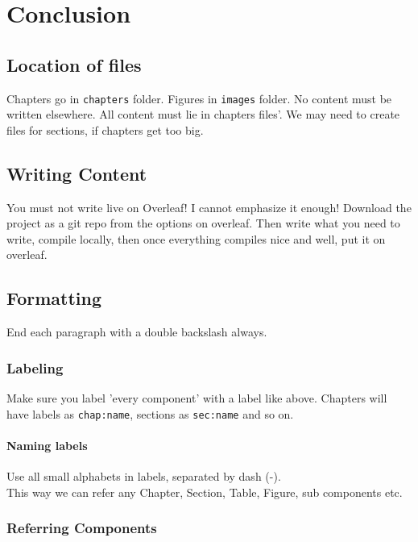 \chapter{Conclusion}
\label{chap:conclusion}

\section{Location of files}
\label{sec:location-files}
Chapters go in \texttt{chapters} folder. Figures in \texttt{images} folder. No content must be written elsewhere. All content must lie in chapters files'. We may need to create files for sections, if chapters get too big.

\section{Writing Content}
\label{sec:content}
You must not write live on Overleaf! I cannot emphasize it enough! Download the project as a git repo from the options on overleaf. Then write what you need to write, compile locally, then once everything compiles nice and well, put it on overleaf.

\section{Formatting}
\label{sec:formatting}

End each paragraph with a double backslash always.\\

\subsection{Labeling}
\label{subsec:labeling}
Make sure you label 'every component' with a label like above. Chapters will have labels as \texttt{chap:name}, sections as \texttt{sec:name} and so on.

\subsubsection{Naming labels}
\label{subsubsec:naming-labels}
Use all small alphabets in labels, separated by dash (-).\\

This way we can refer any Chapter, Section, Table, Figure, sub components etc.

\subsection{Referring Components}
\label{subsec:referring-components}

